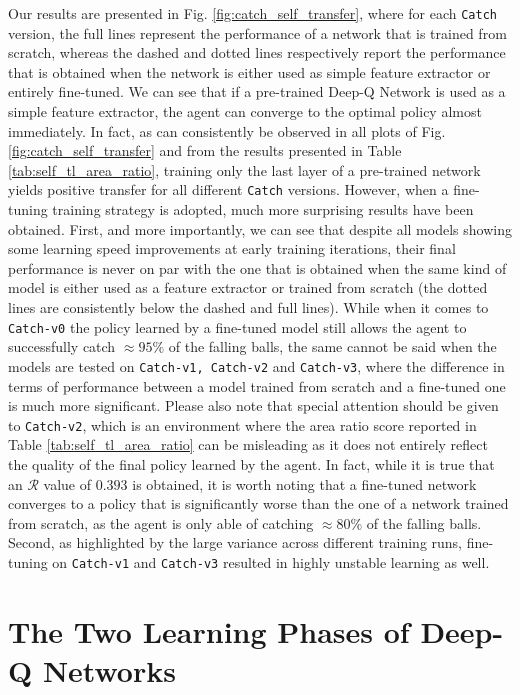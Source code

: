 Our results are presented in Fig. \ref{fig:catch_self_transfer}, where for each \texttt{Catch} version, the full lines represent the performance of a network that is trained from scratch, whereas the dashed and dotted lines respectively report the performance that is obtained when the network is either used as simple feature extractor or entirely fine-tuned. We can see that if a pre-trained Deep-Q Network is used as a simple feature extractor, the agent can converge to the optimal policy almost immediately. In fact, as can consistently be observed in all plots of Fig. \ref{fig:catch_self_transfer} and from the results presented in Table \ref{tab:self_tl_area_ratio}, training only the last layer of a pre-trained network yields positive transfer for all different \texttt{Catch} versions. However, when a fine-tuning training strategy is adopted, much more surprising results have been obtained. First, and more importantly, we can see that despite all models showing some learning speed improvements at early training iterations, their final performance is never on par with the one that is obtained when the same kind of model is either used as a feature extractor or trained from scratch (the dotted lines are consistently below the dashed and full lines). While when it comes to \texttt{Catch-v0} the policy learned by a fine-tuned model still allows the agent to successfully catch $\approx 95\%$ of the falling balls, the same cannot be said when the models are tested on \texttt{Catch-v1, Catch-v2} and \texttt{Catch-v3}, where the difference in terms of performance between a model trained from scratch and a fine-tuned one is much more significant. Please also note that special attention should be given to \texttt{Catch-v2}, which is an environment where the area ratio score reported in Table \ref{tab:self_tl_area_ratio} can be misleading as it does not entirely reflect the quality of the final policy learned by the agent. In fact, while it is true that an $\mathscr{R}$ value of $0.393$ is obtained, it is worth noting that a fine-tuned network converges to a policy that is significantly worse than the one of a network trained from scratch, as the agent is only able of catching $\approx 80\%$ of the falling balls. Second, as highlighted by the large variance across different training runs, fine-tuning on \texttt{Catch-v1} and \texttt{Catch-v3} resulted in highly unstable learning as well.   



\section{The Two Learning Phases of Deep-Q Networks}
\label{sec:hybrid_self_transfer}

